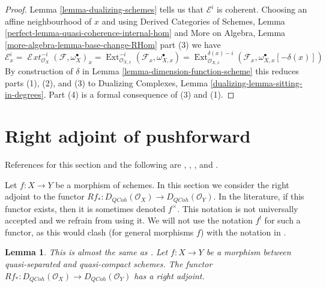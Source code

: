 \documentclass{stacks-project}
\newenvironment{reference}{\comment}{\endcomment}
\theoremstyle{plain}
\newtheorem{lemma}[subsection]{Lemma}
\theoremstyle{definition}
\theoremstyle{remark}
\numberwithin{equation}{subsection}
\def\Ext{\mathop{\mathrm{Ext}}\nolimits}
\def\SheafExt{\mathop{\mathcal{E}\!\mathit{xt}}\nolimits}
\def\QCoh{\mathit{QCoh}}
\begin{document}
\begin{proof}
Lemma \ref{lemma-dualizing-schemes} tells us that $\mathcal{E}^i$
is coherent. Choosing an affine neighbourhood of $x$ and using
Derived Categories of Schemes, Lemma
\ref{perfect-lemma-quasi-coherence-internal-hom}
and
More on Algebra, Lemma
\ref{more-algebra-lemma-base-change-RHom} part (3)
we have
$$
\mathcal{E}^i_x =
\SheafExt^{-i}_{\mathcal{O}_X}(\mathcal{F}, \omega_X^\bullet)_x =
\Ext^{-i}_{\mathcal{O}_{X, x}}(\mathcal{F}_x,
\omega_{X, x}^\bullet) =
\Ext^{\delta(x) - i}_{\mathcal{O}_{X, x}}(\mathcal{F}_x,
\omega_{X, x}^\bullet[-\delta(x)])
$$
By construction of $\delta$ in Lemma \ref{lemma-dimension-function-scheme}
this reduces parts (1), (2), and (3) to
Dualizing Complexes, Lemma \ref{dualizing-lemma-sitting-in-degrees}.
Part (4) is a formal consequence of (3) and (1).
\end{proof}




\section{Right adjoint of pushforward}
\label{section-twisted-inverse-image}

\noindent
References for this section and the following are
\cite{Neeman-Grothendieck}, \cite{LN},
\cite{Lipman-notes}, and \cite{Neeman-improvement}.

\medskip\noindent
Let $f : X \to Y$ be a morphism of schemes.
In this section we consider the right adjoint to the functor
$Rf_* : D_\QCoh(\mathcal{O}_X) \to D_\QCoh(\mathcal{O}_Y)$.
In the literature, if this functor exists, then it is sometimes
denoted $f^{\times}$. This notation is not universally accepted and we refrain
from using it. We will not use the notation $f^!$ for such a functor,
as this would clash (for general morphisms $f$) with the notation in
\cite{RD}.

\begin{lemma}
\label{lemma-twisted-inverse-image}
\begin{reference}
This is almost the same as \cite[Example 4.2]{Neeman-Grothendieck}.
\end{reference}
Let $f : X \to Y$ be a morphism between quasi-separated and quasi-compact
schemes. The functor $Rf_* : D_\QCoh(\mathcal{O}_X) \to D_\QCoh(\mathcal{O}_Y)$
has a right adjoint.
\end{lemma}
\end{document}
